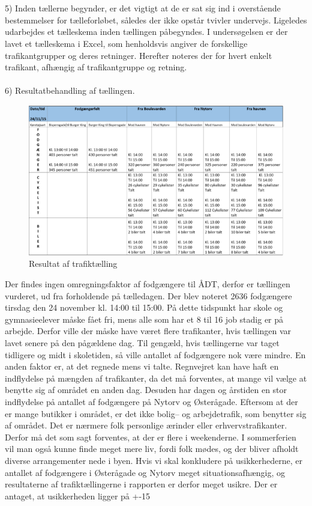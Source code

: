 \\\\
5) Inden tællerne begynder, er det vigtigt at de er sat sig ind i overstående bestemmelser for tælleforløbet, således der ikke opstår tvivler undervejs. Ligeledes udarbejdes et tælleskema inden tællingen påbegyndes. I undersøgelsen er der lavet et tælleskema i Excel, som henholdsvis angiver de forskellige trafikantgrupper og deres retninger. Herefter noteres der for hvert enkelt trafikant, afhængig af trafikantgruppe og retning. 
\\\\
6) Resultatbehandling af tællingen. 
\begin{figure}[htbp]
   \label{fig:trafiktaellingen}
   \centering
   \begin{adjustbox}{max width=\textwidth}
     \includegraphics[scale=1]{billederogfigur/trafiktaellingen.jpg}
  \end{adjustbox}
   \caption{Resultat af trafiktælling}
 \end{figure}
Der findes ingen omregningsfaktor af fodgængere til ÅDT, derfor er tællingen vurderet, ud fra forholdende på tælledagen. Der blev noteret 2636 fodgængere tirsdag den 24 november kl. 14:00 til 15:00. På dette tidspunkt har skole og gymnasieelever måske fået fri, mens alle som har et 8 til 16 job stadig er på arbejde. Derfor ville der måske have været flere trafikanter, hvis tællingen var lavet senere på den pågældene dag. Til gengæld, hvis tællingerne var taget tidligere og midt i skoletiden, så ville antallet af fodgængere nok være mindre. En anden faktor er, at det regnede mens vi talte. Regnvejret kan have haft en indflydelse på mængden af trafikanter, da det må forventes, at mange vil vælge at benytte sig af området en anden dag. Desuden har dagen og årstiden en stor indflydelse på antallet af fodgængere på Nytorv og Østerågade. Eftersom at der er mange butikker i området, er det ikke bolig– og arbejdetrafik, som benytter sig af området. Det er nærmere folk personlige ærinder eller erhvervstrafikanter. Derfor må det som sagt forventes, at der er flere i weekenderne. I sommerferien vil man også kunne finde meget mere liv, fordi folk mødes, og der bliver afholdt diverse arrangementer nede i byen. Hvis vi skal konkludere på usikkerhederne, er antallet af fodgængere i Østerågade og Nytorv meget situationsafhængig, og resultaterne af trafiktællingerne i rapporten er derfor meget usikre. Der er antaget, at usikkerheden ligger på +-15%
